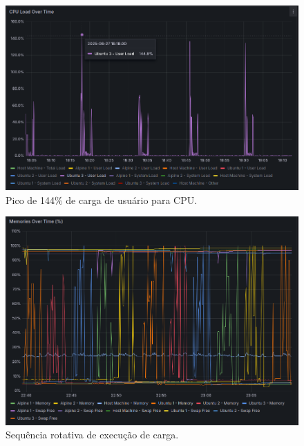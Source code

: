 {\begin{figure}[H]
\centering
\color{red}
\setlength{\abovecaptionskip}{-20pt}
\includegraphics[width=\textwidth]{Imagens/chap04/dashboard/cpu144.png}
\caption{Pico de 144\% de carga de usuário para CPU.}
\label{fig:dashboard-cpu144}
\end{figure}

\begin{figure}[H]
\centering
\color{red}
\setlength{\abovecaptionskip}{-20pt}
\includegraphics[width=\textwidth]{Imagens/chap04/dashboard/round_robin_sequence.png}
\caption{Sequência rotativa de execução de carga.}
\label{fig:roundrobin}
\end{figure}













}
